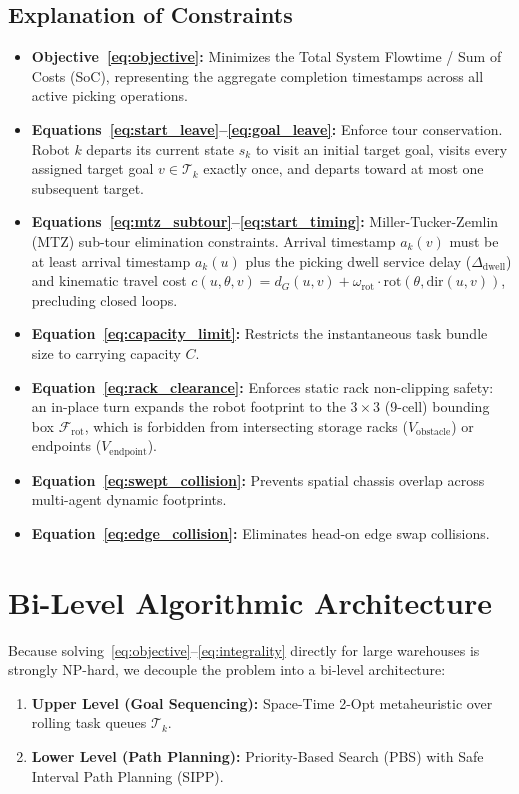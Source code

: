 \documentclass[journal]{IEEEtran}
\begin{document}
\subsection{Explanation of Constraints}
\begin{itemize}
    \item \textbf{Objective~\eqref{eq:objective}:} Minimizes the Total System Flowtime / Sum of Costs (SoC), representing the aggregate completion timestamps across all active picking operations.
    \item \textbf{Equations~\eqref{eq:start_leave}--\eqref{eq:goal_leave}:} Enforce tour conservation. Robot $k$ departs its current state $s_k$ to visit an initial target goal, visits every assigned target goal $v \in \mathcal{T}_k$ exactly once, and departs toward at most one subsequent target.
    \item \textbf{Equations~\eqref{eq:mtz_subtour}--\eqref{eq:start_timing}:} Miller-Tucker-Zemlin (MTZ) sub-tour elimination constraints. Arrival timestamp $a_k(v)$ must be at least arrival timestamp $a_k(u)$ plus the picking dwell service delay ($\Delta_{\text{dwell}}$) and kinematic travel cost $c(u, \theta, v) = d_G(u, v) + \omega_{\text{rot}} \cdot \text{rot}(\theta, \text{dir}(u, v))$, precluding closed loops.
    \item \textbf{Equation~\eqref{eq:capacity_limit}:} Restricts the instantaneous task bundle size to carrying capacity $C$.
    \item \textbf{Equation~\eqref{eq:rack_clearance}:} Enforces static rack non-clipping safety: an in-place turn expands the robot footprint to the $3 \times 3$ (9-cell) bounding box $\mathcal{F}_{\text{rot}}$, which is forbidden from intersecting storage racks ($V_{\text{obstacle}}$) or endpoints ($V_{\text{endpoint}}$).
    \item \textbf{Equation~\eqref{eq:swept_collision}:} Prevents spatial chassis overlap across multi-agent dynamic footprints.
    \item \textbf{Equation~\eqref{eq:edge_collision}:} Eliminates head-on edge swap collisions.
\end{itemize}

\section{Bi-Level Algorithmic Architecture}
\label{sec:algorithms}

Because solving~\eqref{eq:objective}--\eqref{eq:integrality} directly for large warehouses is strongly NP-hard, we decouple the problem into a bi-level architecture:
\begin{enumerate}
    \item \textbf{Upper Level (Goal Sequencing):} Space-Time 2-Opt metaheuristic over rolling task queues $\mathcal{T}_k$.
    \item \textbf{Lower Level (Path Planning):} Priority-Based Search (PBS) with Safe Interval Path Planning (SIPP).
\end{enumerate}
\end{document}
